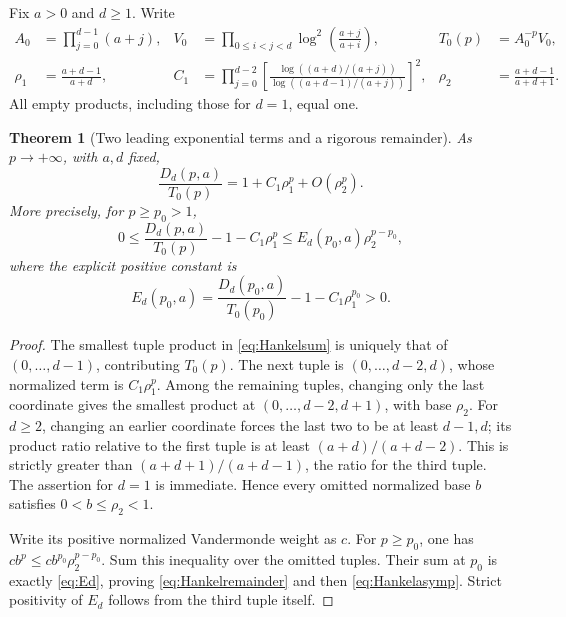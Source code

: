 \documentclass[11pt]{article}
\numberwithin{equation}{section}
\newtheorem{theorem}{Theorem}[section]
\theoremstyle{definition}\newtheorem{definition}[theorem]{Definition}
\theoremstyle{remark}\newtheorem{remark}[theorem]{Remark}
\begin{document}
Fix $a>0$ and $d\ge1$. Write
\begin{align}
 A_0&=\prod_{j=0}^{d-1}(a+j),&
 V_0&=\prod_{0\le i<j<d}\log^2\left(\frac{a+j}{a+i}\right),&
 T_0(p)&=A_0^{-p}V_0,\label{eq:A0V0}\\
 \rho_1&=\frac{a+d-1}{a+d},&
 C_1&=\prod_{j=0}^{d-2}
 \left[\frac{\log((a+d)/(a+j))}{\log((a+d-1)/(a+j))}\right]^2,&
 \rho_2&=\frac{a+d-1}{a+d+1}.
 \label{eq:rho}
\end{align}
All empty products, including those for $d=1$, equal one.

\begin{theorem}[Two leading exponential terms and a rigorous remainder]
\label{thm:Hankelasymptotic}
As $p\to+\infty$, with $a,d$ fixed,
\begin{equation}\label{eq:Hankelasymp}
 \frac{D_d(p,a)}{T_0(p)}
                  =1+C_1\rho_1^p+O(\rho_2^p).
\end{equation}
More precisely, for $p\ge p_0>1$,
\begin{equation}\label{eq:Hankelremainder}
 0\le\frac{D_d(p,a)}{T_0(p)}-1-C_1\rho_1^p
 \le E_d(p_0,a)\rho_2^{p-p_0},
\end{equation}
where the explicit positive constant is
\begin{equation}\label{eq:Ed}
 E_d(p_0,a)=\frac{D_d(p_0,a)}{T_0(p_0)}-1-C_1\rho_1^{p_0}>0.
\end{equation}
\end{theorem}
\begin{proof}
The smallest tuple product in \eqref{eq:Hankelsum} is uniquely that of
$(0,\ldots,d-1)$, contributing $T_0(p)$. The next tuple is
$(0,\ldots,d-2,d)$, whose normalized term is $C_1\rho_1^p$.
Among the remaining tuples, changing only the last coordinate gives
the smallest product at $(0,\ldots,d-2,d+1)$, with base $\rho_2$.
For $d\ge2$, changing an earlier coordinate forces the last two to be
at least $d-1,d$; its product ratio relative to the first tuple is at
least $(a+d)/(a+d-2)$. This is strictly greater than
$(a+d+1)/(a+d-1)$, the ratio for the third tuple. The assertion for
$d=1$ is immediate. Hence every omitted normalized base $b$ satisfies
$0<b\le\rho_2<1$.

Write its positive normalized Vandermonde weight as $c$. For
$p\ge p_0$, one has $cb^p\le cb^{p_0}\rho_2^{p-p_0}$.
Sum this inequality over the omitted tuples. Their sum at $p_0$ is
exactly \eqref{eq:Ed}, proving \eqref{eq:Hankelremainder} and then
\eqref{eq:Hankelasymp}. Strict positivity of $E_d$ follows from the
third tuple itself.
\end{proof}
\end{document}
